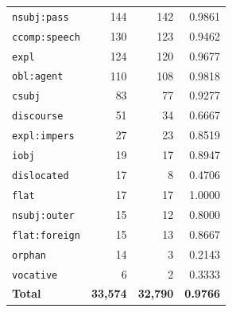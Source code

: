 \begin{table}[ht]
\begin{tabular}{lrrr}
\texttt{nsubj\!:\!pass} & 144 & 142 & 0.9861 \\
\texttt{ccomp\!:\!speech} & 130 & 123 & 0.9462 \\
\texttt{expl} & 124 & 120 & 0.9677 \\
\texttt{obl\!:\!agent} & 110 & 108 & 0.9818 \\
\texttt{csubj} & 83 & 77 & 0.9277 \\
\texttt{discourse} & 51 & 34 & 0.6667 \\
\texttt{expl\!:\!impers} & 27 & 23 & 0.8519 \\
\texttt{iobj} & 19 & 17 & 0.8947 \\
\texttt{dislocated} & 17 & 8 & 0.4706 \\
\texttt{flat} & 17 & 17 & 1.0000 \\
\texttt{nsubj\!:\!outer} & 15 & 12 & 0.8000 \\
\texttt{flat\!:\!foreign} & 15 & 13 & 0.8667 \\
\texttt{orphan} & 14 & 3 & 0.2143 \\
\texttt{vocative} & 6 & 2 & 0.3333 \\
\midrule
\textbf{Total} & \textbf{33,574} & \textbf{32,790} & \textbf{0.9766} \\
\bottomrule
\end{tabular}
\end{table}
